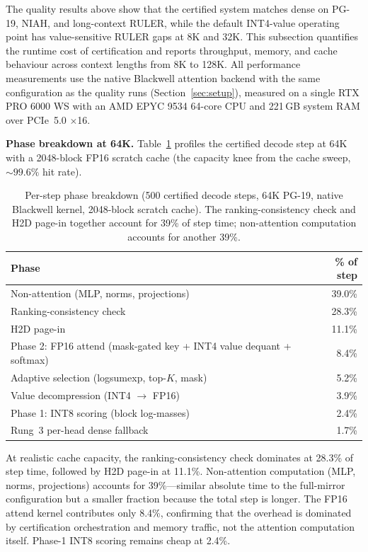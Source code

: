 \documentclass[11pt,a4paper]{article}
\theoremstyle{definition}
\theoremstyle{remark}
\begin{document}
The quality results above show that the certified system matches dense on PG-19, NIAH, and long-context RULER, while the default INT4-value operating point has value-sensitive RULER gaps at 8K and 32K.  This subsection quantifies the runtime cost of certification and reports throughput, memory, and cache behaviour across context lengths from 8K to 128K.  All performance measurements use the native Blackwell attention backend with the same configuration as the quality runs (Section~\ref{sec:setup}), measured on a single RTX PRO 6000 WS with an AMD EPYC 9534 64-core CPU and 221\,GB system RAM over PCIe~5.0 $\times$16.

\textbf{Phase breakdown at 64K.}  Table~\ref{tab:phase_breakdown} profiles the certified decode step at 64K with a 2048-block FP16 scratch cache (the capacity knee from the cache sweep, ${\sim}99.6\%$ hit rate).

\begin{table}[H]
\centering
\caption{Per-step phase breakdown (500 certified decode steps, 64K PG-19, native Blackwell kernel, 2048-block scratch cache).  The ranking-consistency check and H2D page-in together account for 39\% of step time; non-attention computation accounts for another 39\%.}
\label{tab:phase_breakdown}
\small
\begin{tabular}{lr}
\toprule
\textbf{Phase} & \textbf{\% of step} \\
\midrule
Non-attention (MLP, norms, projections) & 39.0\% \\
Ranking-consistency check & 28.3\% \\
H2D page-in & 11.1\% \\
Phase 2: FP16 attend (mask-gated key + INT4 value dequant + softmax) & 8.4\% \\
Adaptive selection (logsumexp, top-$K$, mask) & 5.2\% \\
Value decompression (INT4 $\to$ FP16) & 3.9\% \\
Phase 1: INT8 scoring (block log-masses) & 2.4\% \\
Rung~3 per-head dense fallback & 1.7\% \\
\bottomrule
\end{tabular}
\end{table}

At realistic cache capacity, the ranking-consistency check dominates at 28.3\% of step time, followed by H2D page-in at 11.1\%.  Non-attention computation (MLP, norms, projections) accounts for 39\%---similar absolute time to the full-mirror configuration but a smaller fraction because the total step is longer.  The FP16 attend kernel contributes only 8.4\%, confirming that the overhead is dominated by certification orchestration and memory traffic, not the attention computation itself.  Phase-1 INT8 scoring remains cheap at 2.4\%.
\end{document}
